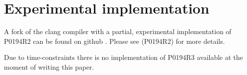 \section{Experimental implementation}
\label{implementation}

A fork of the clang compiler with a partial, experimental implementation
of P0194R2 can be found on github \cite{ReflexprImplementation}.
Please see \cite{Chochlik-P0194R2} (P0194R2) for more details.

Due to time-constraints there is no implementation of P0194R3 available
at the moment of writing this paper.

